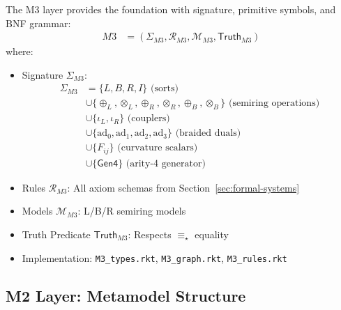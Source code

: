 \begin{definition}
\label{def:m3-complete}
The M3 layer provides the foundation with signature, primitive symbols, and BNF grammar:
\begin{align}
M3 &= (\Sigma_{M3}, \mathcal{R}_{M3}, \mathcal{M}_{M3}, \mathsf{Truth}_{M3})
\end{align}
where:
\begin{itemize}
\item Signature $\Sigma_{M3}$:
  \begin{align}
  \Sigma_{M3} &= \{L, B, R, I\} \text{ (sorts)} \\
  &\cup \{\oplus_L, \otimes_L, \oplus_R, \otimes_R, \oplus_B, \otimes_B\} \text{ (semiring operations)} \\
  &\cup \{\iota_L, \iota_R\} \text{ (couplers)} \\
  &\cup \{\text{ad}_0, \text{ad}_1, \text{ad}_2, \text{ad}_3\} \text{ (braided duals)} \\
  &\cup \{F_{ij}\} \text{ (curvature scalars)} \\
  &\cup \{\mathsf{Gen4}\} \text{ (arity-4 generator)}
  \end{align}
\item Rules $\mathcal{R}_{M3}$: All axiom schemas from Section~\ref{sec:formal-systems}
\item Models $\mathcal{M}_{M3}$: L/B/R semiring models
\item Truth Predicate $\mathsf{Truth}_{M3}$: Respects $\equiv_\star$ equality
\item Implementation: \texttt{M3\_types.rkt}, \texttt{M3\_graph.rkt}, \texttt{M3\_rules.rkt}
\end{itemize}
\end{definition}

\subsection{M2 Layer: Metamodel Structure}

